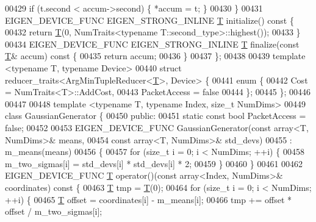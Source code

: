 \begin{DoxyCode}
00429     \textcolor{keywordflow}{if} (t.second < accum->second) \{ *accum = t; \}
00430   \}
00431   EIGEN\_DEVICE\_FUNC EIGEN\_STRONG\_INLINE \hyperlink{group___sparse_core___module_class_eigen_1_1_triplet}{T} initialize()\textcolor{keyword}{ const }\{
00432     \textcolor{keywordflow}{return} \hyperlink{group___sparse_core___module_class_eigen_1_1_triplet}{T}(0, NumTraits<typename T::second\_type>::highest());
00433   \}
00434   EIGEN\_DEVICE\_FUNC EIGEN\_STRONG\_INLINE \hyperlink{group___sparse_core___module_class_eigen_1_1_triplet}{T} finalize(\textcolor{keyword}{const} \hyperlink{group___sparse_core___module_class_eigen_1_1_triplet}{T}& accum)\textcolor{keyword}{ const }\{
00435     \textcolor{keywordflow}{return} accum;
00436   \}
00437 \};
00438 
00439 \textcolor{keyword}{template} <\textcolor{keyword}{typename} T, \textcolor{keyword}{typename} Device>
00440 \textcolor{keyword}{struct }reducer\_traits<ArgMinTupleReducer<\hyperlink{group___sparse_core___module_class_eigen_1_1_triplet}{T}>, Device> \{
00441   \textcolor{keyword}{enum} \{
00442     Cost = NumTraits<T>::AddCost,
00443     PacketAccess = \textcolor{keyword}{false}
00444   \};
00445 \};
00446 
00447 
00448 \textcolor{keyword}{template} <\textcolor{keyword}{typename} T, \textcolor{keyword}{typename} Index, \textcolor{keywordtype}{size\_t} NumDims>
00449 \textcolor{keyword}{class }GaussianGenerator \{
00450  \textcolor{keyword}{public}:
00451   \textcolor{keyword}{static} \textcolor{keyword}{const} \textcolor{keywordtype}{bool} PacketAccess = \textcolor{keyword}{false};
00452 
00453   EIGEN\_DEVICE\_FUNC GaussianGenerator(\textcolor{keyword}{const} array<T, NumDims>& means,
00454                                       \textcolor{keyword}{const} array<T, NumDims>& std\_devs)
00455       : m\_means(means)
00456   \{
00457     \textcolor{keywordflow}{for} (\textcolor{keywordtype}{size\_t} i = 0; i < NumDims; ++i) \{
00458       m\_two\_sigmas[i] = std\_devs[i] * std\_devs[i] * 2;
00459     \}
00460   \}
00461 
00462   EIGEN\_DEVICE\_FUNC \hyperlink{group___sparse_core___module_class_eigen_1_1_triplet}{T} operator()(\textcolor{keyword}{const} array<Index, NumDims>& coordinates)\textcolor{keyword}{ const }\{
00463     \hyperlink{group___sparse_core___module_class_eigen_1_1_triplet}{T} tmp = \hyperlink{group___sparse_core___module_class_eigen_1_1_triplet}{T}(0);
00464     \textcolor{keywordflow}{for} (\textcolor{keywordtype}{size\_t} i = 0; i < NumDims; ++i) \{
00465       \hyperlink{group___sparse_core___module_class_eigen_1_1_triplet}{T} offset = coordinates[i] - m\_means[i];
00466       tmp += offset * offset / m\_two\_sigmas[i];

\end{DoxyCode}
